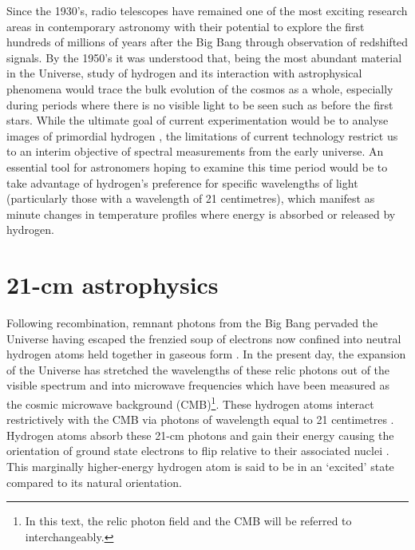 Since the 1930’s, radio telescopes have remained one of the most exciting research areas in contemporary astronomy with their potential to explore the first hundreds of millions of years after the Big Bang through observation of redshifted signals. By the 1950’s it was understood that, being the most abundant material in the Universe, study of hydrogen and its interaction with astrophysical phenomena would trace the bulk evolution of the cosmos as a whole, especially during periods where there is no visible light to be seen such as before the first stars. While the ultimate goal of current experimentation would be to analyse images of primordial hydrogen \citep{liuData,21in21}, the limitations of current technology restrict us to an interim objective of spectral measurements from the early universe. An essential tool for astronomers hoping to examine this time period would be to take advantage of hydrogen’s preference for specific wavelengths of light (particularly those with a wavelength of 21 centimetres), which manifest as minute changes in temperature profiles where energy is absorbed or released by hydrogen.


\section{21-cm astrophysics}\label{sec:21cm}
Following recombination, remnant photons from the Big Bang pervaded the Universe having escaped the frenzied soup of electrons now confined into neutral hydrogen atoms held together in gaseous form \citep{ryden}. In the present day, the expansion of the Universe has stretched the wavelengths of these relic photons out of the visible spectrum and into microwave frequencies which have been measured as the cosmic microwave background (CMB)\footnote{In this text, the relic photon field and the CMB will be referred to interchangeably.}. These hydrogen atoms interact restrictively with the CMB via photons of wavelength equal to 21 centimetres \citep{lofar}. Hydrogen atoms absorb these 21-cm photons and gain their energy causing the orientation of ground state electrons to flip relative to their associated nuclei \citep{furProbe}. This marginally higher-energy hydrogen atom is said to be in an ‘excited’ state compared to its natural orientation. 

